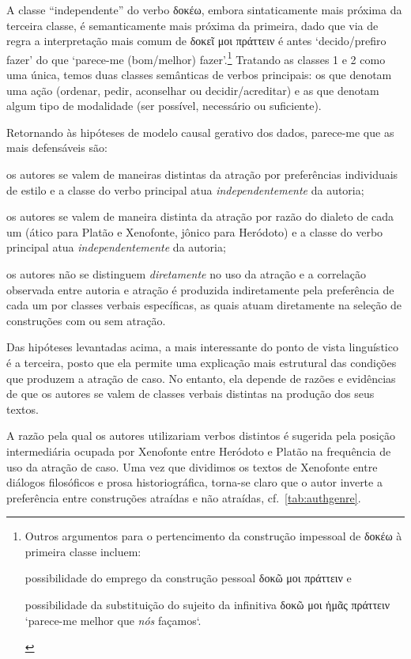 \documentclass[a4paper,article,12pt,oneside]{memoir}
\begin{document}
\noindent A classe ``independente'' do verbo δοκέω, embora sintaticamente mais próxima da terceira classe, é semanticamente mais próxima da primeira, dado que via de regra a interpretação mais comum de δοκεῖ μοι πράττειν é antes `decido\slash{}prefiro fazer' do que `parece-me (bom\slash{}melhor) fazer'.\footnote{Outros argumentos para o pertencimento da construção impessoal de δοκέω à primeira classe incluem:
	\begin{inparaenum}
		\item possibilidade do emprego da construção pessoal δοκῶ μοι πράττειν e
		\item possibilidade da substituição do sujeito da infinitiva δοκῶ μοι ἡμᾶς πράττειν `parece-me melhor que \emph{nós} façamos`.
	\end{inparaenum}
}
Tratando as classes 1 e 2 como uma única, temos duas classes semânticas de verbos principais:
os que denotam uma ação (ordenar, pedir, aconselhar ou decidir\slash{}acreditar) e as que denotam algum tipo de modalidade (ser possível, necessário ou suficiente).

Retornando às hipóteses de modelo causal gerativo dos dados, parece-me que as mais defensáveis são:
\begin{compactenum}
	\item os autores se valem de maneiras distintas da atração por preferências individuais de estilo e a classe do verbo principal atua \emph{independentemente} da autoria;
	\item os autores se valem de maneira distinta da atração por razão do dialeto de cada um (ático para Platão e Xenofonte, jônico para Heródoto) e a classe do verbo principal atua \emph{independentemente} da autoria;
	\item os autores não se distinguem \emph{diretamente} no uso da atração e a correlação observada entre autoria e atração é produzida indiretamente pela preferência de cada um por classes verbais específicas, as quais atuam diretamente na seleção de construções com ou sem atração.
\end{compactenum}

Das hipóteses levantadas acima, a mais interessante do ponto de vista linguístico é a terceira, posto que ela permite uma explicação mais estrutural das condições que produzem a atração de caso.
No entanto, ela depende de razões e evidências de que os autores se valem de classes verbais distintas na produção dos seus textos.

A razão pela qual os autores utilizariam verbos distintos é sugerida pela posição intermediária ocupada por Xenofonte entre Heródoto e Platão na frequência de uso da atração de caso.
Uma vez que dividimos os textos de Xenofonte entre diálogos filosóficos e prosa historiográfica, torna-se claro que o autor inverte a preferência entre construções atraídas e não atraídas, cf.~\autoref{tab:authgenre}.
\end{document}
